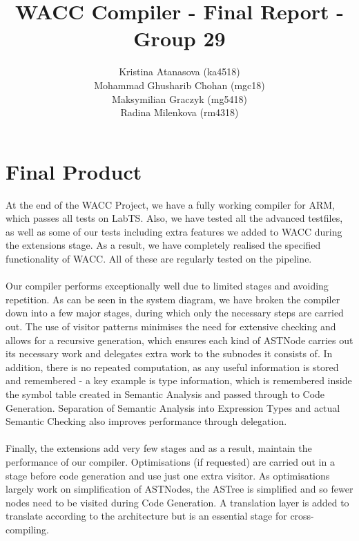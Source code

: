\documentclass[5pt]{article}
\begin{document}
\title{WACC Compiler - Final Report - Group 29}
\date{}
\author{
Kristina Atanasova (ka4518) \\
Mohammad Ghusharib Chohan (mgc18) \\
Maksymilian Graczyk (mg5418) \\
Radina Milenkova (rm4318)
}
\maketitle

\section{Final Product}

At the end of the WACC Project, we have a fully working compiler for ARM, which passes all tests on LabTS. Also, we have tested all the advanced testfiles, as well as some of our tests including extra features we added to WACC during the extensions stage. As a result, we have completely realised the specified functionality of WACC. All of these are regularly tested on the pipeline.
\\ \\
Our compiler performs exceptionally well due to limited stages and avoiding repetition. As can be seen in the system diagram, we have broken the compiler down into a few major stages, during which only the necessary steps are carried out. The use of visitor patterns minimises the need for extensive checking and allows for a recursive generation, which ensures each kind of ASTNode carries out its necessary work and delegates extra work to the subnodes it consists of. In addition, there is no repeated computation, as any useful information is stored and remembered - a key example is type information, which is remembered inside the symbol table created in Semantic Analysis and passed through to Code Generation. Separation of Semantic Analysis into Expression Types and actual Semantic Checking also improves performance through delegation.
\\ \\
Finally, the extensions add very few stages and as a result, maintain the performance of our compiler. Optimisations (if requested) are carried out in a stage before code generation and use just one extra visitor. As optimisations largely work on simplification of ASTNodes, the ASTree is simplified and so fewer nodes need to be visited during Code Generation. A translation layer is added to translate according to the architecture but is an essential stage for cross-compiling.
\end{document}
